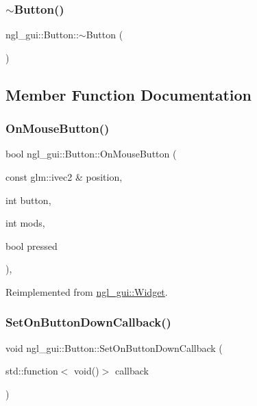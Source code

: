 \subsubsection{\texorpdfstring{$\sim$\+Button()}{~Button()}}
{\footnotesize\ttfamily ngl\+\_\+gui\+::\+Button\+::$\sim$\+Button (\begin{DoxyParamCaption}{ }\end{DoxyParamCaption})\hspace{0.3cm}{\ttfamily [virtual]}}



\subsection{Member Function Documentation}
\mbox{\label{classngl__gui_1_1_button_a1022c031cb9bb6658d8a6bb22295508d}} 
\subsubsection{\texorpdfstring{On\+Mouse\+Button()}{OnMouseButton()}}
{\footnotesize\ttfamily bool ngl\+\_\+gui\+::\+Button\+::\+On\+Mouse\+Button (\begin{DoxyParamCaption}\item[{const glm\+::ivec2 \&}]{position,  }\item[{int}]{button,  }\item[{int}]{mods,  }\item[{bool}]{pressed }\end{DoxyParamCaption})\hspace{0.3cm}{\ttfamily [override]}, {\ttfamily [virtual]}}



Reimplemented from \mbox{\hyperlink{classngl__gui_1_1_widget_a721b18dc7a09b0b7b4ff0c02162409b8}{ngl\+\_\+gui\+::\+Widget}}.

\mbox{\label{classngl__gui_1_1_button_a739337d2d66c43de5c0c6a7d0bc3552b}} 
\subsubsection{\texorpdfstring{Set\+On\+Button\+Down\+Callback()}{SetOnButtonDownCallback()}}
{\footnotesize\ttfamily void ngl\+\_\+gui\+::\+Button\+::\+Set\+On\+Button\+Down\+Callback (\begin{DoxyParamCaption}\item[{std\+::function$<$ void()$>$}]{callback }\end{DoxyParamCaption})}

